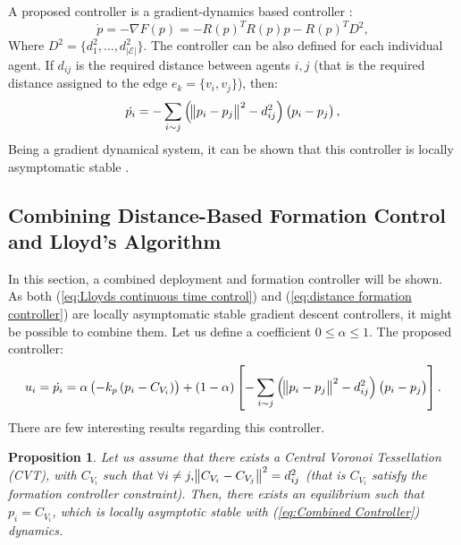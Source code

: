 \documentclass{iacas}
\newtheorem{proposition}{Proposition}
\begin{document}
A proposed controller is a gradient-dynamics based controller \cite{Kwang-KyoOh2011,Krick2008}:
\begin{equation}
\dot{p} = -\nabla F(p) = -R(p)^{T} R(p) p - R(p)^{T}D^2,
\label{eq:distance formation controller}
\end{equation}
Where $D^2 = \{d_1^2, \ldots, d_{|\mathcal{E}|}^2\}$. %
The controller can be also defined for each individual agent. If $d_{ij}$ is the required distance between agents $i,j$ (that is the required distance assigned to the edge $e_k = \{v_i, v_j\}$), then:
\begin{equation}
    \dot{p_{i}} = -\sum_{i \sim j} \left( \norm{p_{i} - p_{j}}^{2} - d_{ij}^2 \right) \left( p_{i} - p_{j} \right),
    \label{eq:distance formation controller for individual agent}
\end{equation}
Being a gradient dynamical system, it can be shown that this controller is locally asymptomatic stable \cite{Kwang-KyoOh2011,Krick2008}.

\subsection{Combining Distance-Based Formation Control and Lloyd's Algorithm}
In this section, a combined deployment and formation controller will be shown. As both (\ref{eq:Lloyds continuous time control}) and (\ref{eq:distance formation controller}) are locally asymptomatic stable gradient descent controllers, it might be possible to combine them. Let us define a coefficient $0 \leq \alpha \leq 1$. The proposed controller:
\begin{equation}
    u_{i} = \dot{p_{i}} = \alpha \left(-k_{p}\left( p_i -C_{V_{i}} \right)\right) +
    \left( 1-\alpha \right)\left[-\sum_{i \sim j} \left( \norm{p_{i} - p_{j}}^{2} - d_{ij}^2 \right) \left( p_{i} - p_{j} \right)  \right].
    \label{eq:Combined Controller}
\end{equation}
There are few interesting results regarding this controller.

\begin{proposition}
    Let us assume that there exists a Central Voronoi Tessellation (CVT), with $C_{V_{i}}$ such that $\forall i \neq j, \norm{C_{V_{i}} - C_{V_{j}}}^{2} = d_{ij}^{2}$ (that is $C_{V_{i}}$ satisfy the formation controller constraint). Then, there exists an equilibrium such that $p_{i} = C_{V_{i}}$, which is locally asymptotic stable with (\ref{eq:Combined Controller}) dynamics.
    \label{proposition 1}
\end{proposition}
\end{document}
